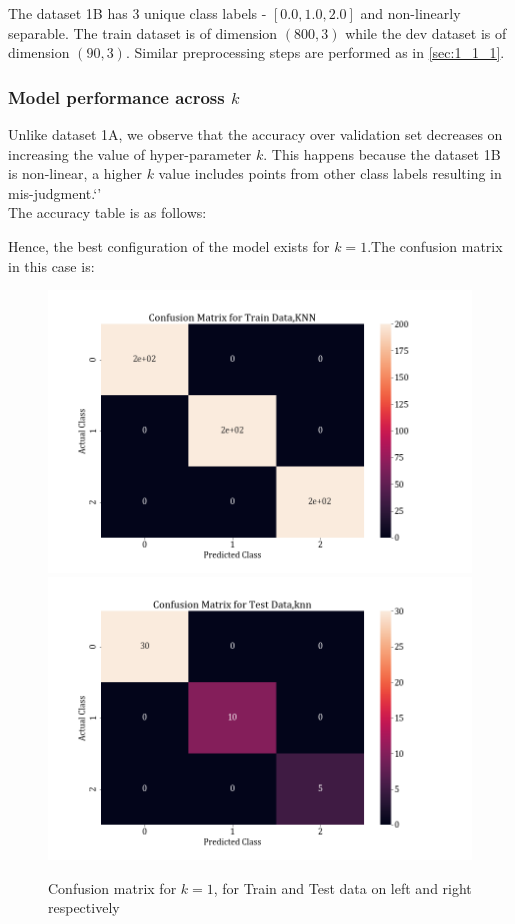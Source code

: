 \documentclass[11pt,a4paper]{article}
\newcommand{\noi}{\noindent}
\begin{document}
\noi
The dataset 1B has 3 unique class labels - $[0.0, 1.0, 2.0]$ and non-linearly separable. The train dataset is of dimension $(800,3)$ while the dev dataset is of dimension $(90,3)$. Similar preprocessing steps are performed as in \autoref{sec:1_1_1}.

\subsubsection{Model performance across $k$}
Unlike dataset 1A, we observe that the accuracy over validation set decreases on increasing the value of hyper-parameter $k$. This happens because the dataset 1B is non-linear, a higher $k$ value includes points from other class labels resulting in mis-judgment.`'\\

\noi
The accuracy table is as follows:


\noi 
Hence, the best configuration of the model exists for $k=1$.The confusion matrix in this case is:

\begin{figure}[H]
    \centering
    \includegraphics[scale=0.85]{images/1b_conf_mat_knn_train.png}
    \includegraphics[scale=0.85]{images/1b_conf_mat_knn_test.png}
    \caption{Confusion matrix for $k=1$, for Train and Test data on left and right respectively }
    \label{fig:1b_cm_KNN}
\end{figure}
\end{document}
